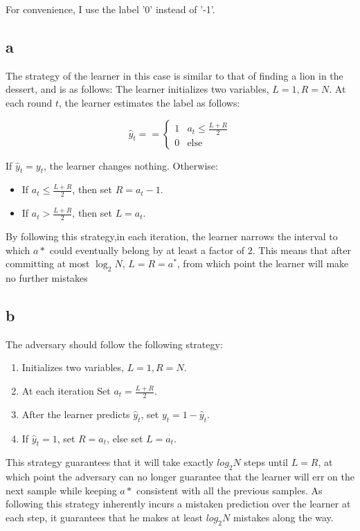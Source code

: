 For convenience, I use the label '0' instead of '-1'.
\subsection*{a}
The strategy of the learner in this case is similar to that of finding a lion in the dessert, and is as follows:
The learner initializes two variables, $L=1, R=N$. At each round $t$, the learner estimates the label as follows:

\begin{equation*}    
    \hat{y}_t==\begin{cases}
        1 & a_t \leq \frac{L+R}{2} \\ 
        0 & \text{else}
             \end{cases}
\end{equation*}

If $\hat{y}_t = y_t$, the learner changes nothing. Otherwise:
\begin{itemize}
    \item If $a_t \leq \frac{L+R}{2}$, then set $R = a_t-1$.
    \item If $a_t > \frac{L+R}{2}$, then set $L = a_t$.
\end{itemize}
By following this strategy,in each iteration, the learner narrows the interval to which $a*$ could eventually belong by at least a factor of 2. This means that after committing at most $\log_2N$, $L=R=a^*$, from which point the learner will make no further mistakes

\subsection*{b}
The adversary should follow the following strategy:
\begin{enumerate}
    \item Initializes two variables, $L=1, R=N$.
    \item At each iteration Set $a_t = \frac{L+R}{2}$.
    \item After the learner predicts $\hat{y}_t$, set $y_t = 1 - \hat{y}_t$.
    \item If $\hat{y}_t = 1$, set $R = a_t$, else set $L = a_t$.
\end{enumerate}
This strategy guarantees that it will take exactly $log_2N$ steps until $L=R$, at which point the adversary can no longer guarantee that the learner will err on the next sample while keeping $a*$ consistent with all the previous samples. As following this strategy inherently incurs a mistaken prediction over the learner at each step, it guarantees that he makes at least $log_2N$ mistakes along the way.